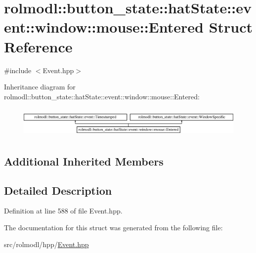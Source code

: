 \hypertarget{structrolmodl_1_1button__state_1_1hat_state_1_1event_1_1window_1_1mouse_1_1_entered}{}\section{rolmodl\+::button\+\_\+state\+::hat\+State\+::event\+::window\+::mouse\+::Entered Struct Reference}
\label{structrolmodl_1_1button__state_1_1hat_state_1_1event_1_1window_1_1mouse_1_1_entered}


{\ttfamily \#include $<$Event.\+hpp$>$}

Inheritance diagram for rolmodl\+::button\+\_\+state\+::hat\+State\+::event\+::window\+::mouse\+::Entered\+:\begin{figure}[H]
\begin{center}
\leavevmode
\includegraphics[height=1.546961cm]{structrolmodl_1_1button__state_1_1hat_state_1_1event_1_1window_1_1mouse_1_1_entered}
\end{center}
\end{figure}
\subsection*{Additional Inherited Members}


\subsection{Detailed Description}


Definition at line 588 of file Event.\+hpp.



The documentation for this struct was generated from the following file\+:\begin{DoxyCompactItemize}
\item 
src/rolmodl/hpp/\mbox{\hyperlink{_event_8hpp}{Event.\+hpp}}\end{DoxyCompactItemize}
